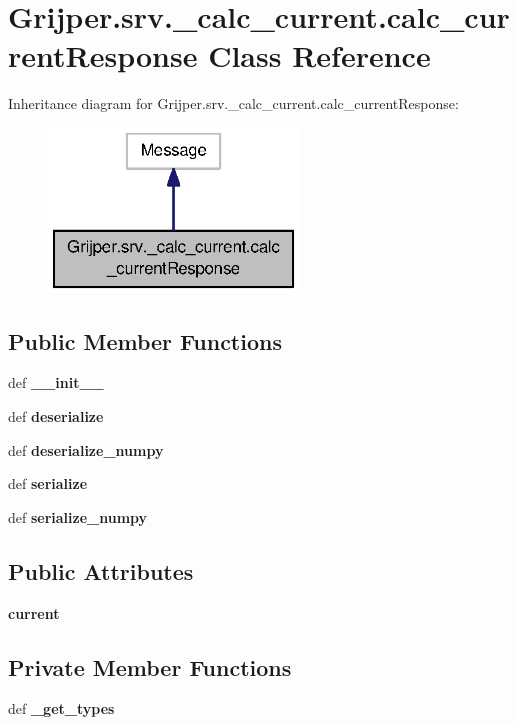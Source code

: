 \section{Grijper.\-srv.\-\_\-calc\-\_\-current.\-calc\-\_\-current\-Response Class Reference}
\label{classGrijper_1_1srv_1_1__calc__current_1_1calc__currentResponse}


Inheritance diagram for Grijper.\-srv.\-\_\-calc\-\_\-current.\-calc\-\_\-current\-Response\-:\nopagebreak
\begin{figure}[H]
\begin{center}
\leavevmode
\includegraphics[width=188pt]{classGrijper_1_1srv_1_1__calc__current_1_1calc__currentResponse__inherit__graph}
\end{center}
\end{figure}
\subsection*{Public Member Functions}
\begin{DoxyCompactItemize}
\item 
def {\bf \-\_\-\-\_\-init\-\_\-\-\_\-}
\item 
def {\bf deserialize}
\item 
def {\bf deserialize\-\_\-numpy}
\item 
def {\bf serialize}
\item 
def {\bf serialize\-\_\-numpy}
\end{DoxyCompactItemize}
\subsection*{Public Attributes}
\begin{DoxyCompactItemize}
\item 
{\bf current}
\end{DoxyCompactItemize}
\subsection*{Private Member Functions}
\begin{DoxyCompactItemize}
\item 
def {\bf \-\_\-get\-\_\-types}
\end{DoxyCompactItemize}

